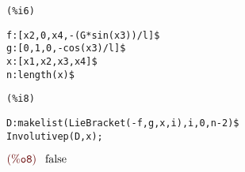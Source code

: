 \noindent
\begin{minipage}[t]{8ex}\color{red}\bf
\begin{verbatim}
(%i6) 
\end{verbatim}
\end{minipage}
\begin{minipage}[t]{\textwidth}\color{blue}
\begin{verbatim}
f:[x2,0,x4,-(G*sin(x3))/l]$
g:[0,1,0,-cos(x3)/l]$
x:[x1,x2,x3,x4]$
n:length(x)$
\end{verbatim}
\end{minipage}

\smallskip

\noindent
\begin{minipage}[t]{8ex}\color{red}\bf
\begin{verbatim}
(%i8) 
\end{verbatim}
\end{minipage}
\begin{minipage}[t]{\textwidth}\color{blue}
\begin{verbatim}
D:makelist(LieBracket(-f,g,x,i),i,0,n-2)$
Involutivep(D,x);
\end{verbatim}
\end{minipage}

\noindent
\begin{math}\displaystyle
\parbox{8ex}{$\color{labelcolor}\mathrm{\tt (\%o8) }\quad $}
\mbox{}\mbox{false}
\end{math}
